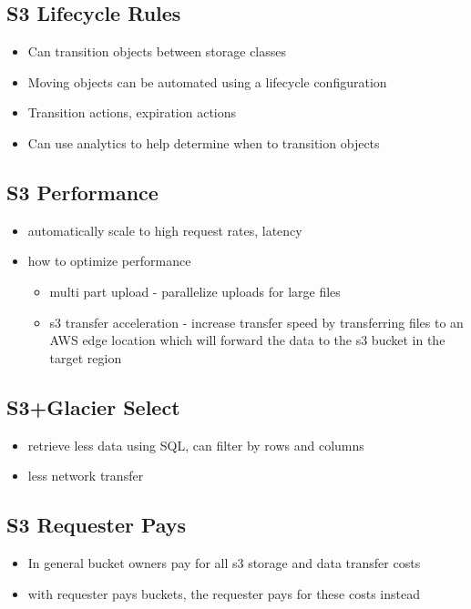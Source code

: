 \documentclass[]{scrartcl}
\begin{document}
\subsection{S3 Lifecycle Rules}
\begin{itemize}
	\item Can transition objects between storage classes
	\item Moving objects can be automated using a lifecycle configuration
	\item Transition actions, expiration actions
	\item Can use analytics to help determine when to transition objects
\end{itemize}

\subsection{S3 Performance}
\begin{itemize}
	\item automatically scale to high request rates, latency
	\item how to optimize performance
	\begin{itemize}
		\item multi part upload - parallelize uploads for large files
		\item s3 transfer acceleration - increase transfer speed by transferring files to an AWS edge location which will forward the data to the s3 bucket in the target region
	\end{itemize}
\end{itemize}

\subsection{S3+Glacier Select}
\begin{itemize}
	\item retrieve less data using SQL, can filter by rows and columns
	\item less network transfer
\end{itemize}

\subsection{S3 Requester Pays}
\begin{itemize}
	\item In general bucket owners pay for all s3 storage and data transfer costs
	\item with requester pays buckets, the requester pays for these costs instead
\end{itemize}
\end{document}
